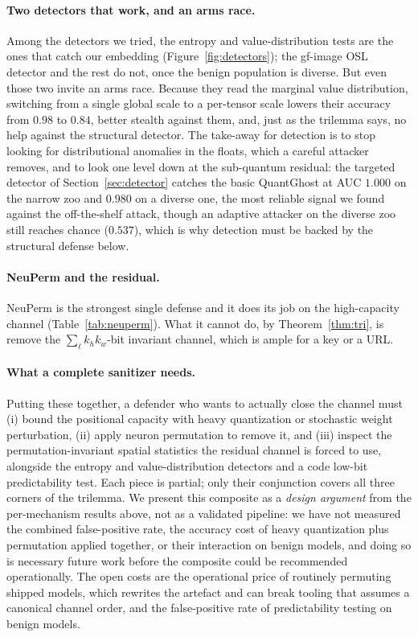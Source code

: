 \documentclass[a4paper,fleqn]{cas-dc}
\theoremstyle{plain}
\theoremstyle{remark}
\newcommand{\sys}{\mbox{QuantGhost}}
\begin{document}
\paragraph{Two detectors that work, and an arms race.} Among the detectors we tried,
the entropy and value-distribution tests are the ones that catch our embedding
(Figure~\ref{fig:detectors}); the gf-image OSL detector and the rest do not, once the
benign population is diverse. But even those two invite an arms race. Because they read
the marginal value distribution, switching from a single global scale to a per-tensor
scale lowers their accuracy from $0.98$ to $0.84$, better stealth against them, and,
just as the trilemma says, no help against the structural detector. The take-away for
detection is to stop looking for distributional anomalies in the floats, which a careful
attacker removes, and to look one level down at the sub-quantum residual: the targeted
detector of Section~\ref{sec:detector} catches the basic \sys{} at AUC $1.000$ on the
narrow zoo and $0.980$ on a diverse one, the most reliable signal we found against the
off-the-shelf attack, though an adaptive attacker on the diverse zoo still reaches chance
($0.537$), which is why detection must be backed by the structural defense below.

\paragraph{NeuPerm and the residual.} NeuPerm is the strongest single defense and it
does its job on the high-capacity channel (Table~\ref{tab:neuperm}). What it cannot do,
by Theorem~\ref{thm:tri}, is remove the $\sum_\ell k_h k_w$-bit invariant channel,
which is ample for a key or a URL.

\paragraph{What a complete sanitizer needs.} Putting these together, a defender who
wants to actually close the channel must (i) bound the positional capacity with heavy
quantization or stochastic weight perturbation, (ii) apply neuron permutation to remove
it, and (iii) inspect the permutation-invariant spatial statistics the residual channel
is forced to use, alongside the entropy and value-distribution detectors and a code
low-bit predictability test. Each piece is partial; only their conjunction covers all
three corners of the trilemma. We present this composite as a \emph{design argument} from the
per-mechanism results above, not as a validated pipeline: we have not measured the combined
false-positive rate, the accuracy cost of heavy quantization plus permutation applied together,
or their interaction on benign models, and doing so is necessary future work before the
composite could be recommended operationally. The open costs are the operational price of
routinely permuting shipped models, which rewrites the artefact and can break tooling that
assumes a canonical channel order, and the false-positive rate of predictability testing on
benign models.
\end{document}
